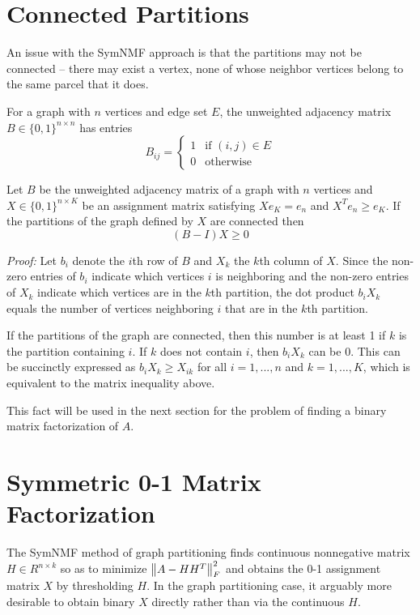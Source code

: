 \section{Connected Partitions}

An issue with the SymNMF approach is that the partitions may not be
connected -- there may exist a vertex, none of whose neighbor vertices
belong to the same parcel that it does.

\begin{definition}
For a graph with $n$ vertices and edge set $E$, the unweighted adjacency
matrix $B \in \{0, 1\}^{n \times n}$ has entries
\[ B_{ij} = \begin{cases}
  1 & \text{if } (i,j) \in E \\
  0 & \text{otherwise}
\end{cases}\]
\end{definition}

\begin{prop} \label{connected}
Let $B$ be the unweighted adjacency matrix of a graph with $n$ vertices
and $X \in \{0, 1\}^{n \times K}$ be an assignment matrix satisfying
$X e_K = e_n$ and $X^T e_n \geq e_K$. If the partitions of the graph
defined by $X$ are connected then
\[ (B - I) X \geq 0 \]

\textit{Proof:} Let $b_i$ denote the $i$th row of $B$ and $X_k$ the
$k$th column of $X$. Since the non-zero entries of $b_i$ indicate
which vertices $i$ is neighboring and the non-zero entries of $X_k$
indicate which vertices are in the $k$th partition, the dot product
$b_i X_k$ equals the number of vertices neighboring $i$ that are in the
$k$th partition.

If the partitions of the graph are connected, then this number is
at least 1 if $k$ is the partition containing $i$. If $k$ does not
contain $i$, then $b_i X_k$ can be 0. This can be succinctly expressed
as $b_i X_k \geq X_{ik}$ for all $i = 1, ..., n$ and $k = 1, ..., K$,
which is equivalent to the matrix inequality above.
\end{prop}

This fact will be used in the next section for the problem of finding
a binary matrix factorization of $A$.


\section{Symmetric 0-1 Matrix Factorization}

The SymNMF method of graph partitioning finds continuous nonnegative
matrix $H \in R^{n \times k}$ so as to minimize $\left\lVert A - H H^T\right\rVert_F^2$
and obtains the 0-1 assignment matrix $X$ by thresholding $H$.
In the graph partitioning case, it arguably more desirable to obtain
binary $X$ directly rather than via the continuous $H$.

